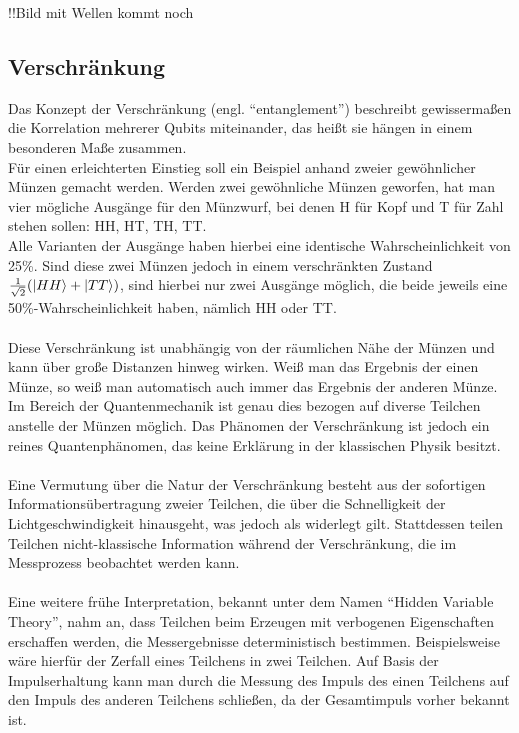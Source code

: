!!Bild mit Wellen kommt noch

\subsection{Verschränkung }

Das Konzept der Verschränkung (engl. ``entanglement'') beschreibt gewissermaßen die Korrelation mehrerer Qubits miteinander, das heißt sie hängen in einem besonderen Maße zusammen. \\
Für einen erleichterten Einstieg soll ein Beispiel anhand zweier gewöhnlicher Münzen gemacht werden. Werden zwei gewöhnliche Münzen geworfen, hat man vier mögliche Ausgänge für den Münzwurf, bei denen H für Kopf und T für Zahl stehen sollen: HH, HT, TH, TT. \\
Alle Varianten der Ausgänge haben hierbei eine identische Wahrscheinlichkeit von 25\%. Sind diese zwei Münzen jedoch in einem verschränkten Zustand  $\frac{1}{\sqrt{2}} (\ket{HH} + \ket{TT})$, sind hierbei nur zwei Ausgänge möglich, die beide jeweils eine 50\%-Wahrscheinlichkeit haben, nämlich HH oder TT. \\ \\
Diese Verschränkung ist unabhängig von der räumlichen Nähe der Münzen und kann über große Distanzen hinweg wirken. Weiß man das Ergebnis der einen Münze, so weiß man automatisch auch immer das Ergebnis der anderen Münze. Im Bereich der Quantenmechanik ist genau dies bezogen auf diverse Teilchen anstelle der Münzen möglich. 
Das Phänomen der Verschränkung ist jedoch ein reines Quantenphänomen, das keine Erklärung in der klassischen Physik besitzt. \\ \\
Eine Vermutung über die Natur der Verschränkung besteht aus der sofortigen Informationsübertragung zweier Teilchen, die über die Schnelligkeit der Lichtgeschwindigkeit hinausgeht, was jedoch als widerlegt gilt. Stattdessen teilen Teilchen nicht-klassische Information während der Verschränkung, die im Messprozess beobachtet werden kann. \\ \\
Eine weitere frühe Interpretation, bekannt unter dem Namen ``Hidden Variable Theory'', nahm an, dass Teilchen beim Erzeugen mit verbogenen Eigenschaften erschaffen werden, die Messergebnisse deterministisch bestimmen. Beispielsweise wäre hierfür der Zerfall eines Teilchens in zwei Teilchen. Auf Basis der Impulserhaltung kann man durch die Messung des Impuls des einen Teilchens auf den Impuls des anderen Teilchens schließen, da der Gesamtimpuls vorher bekannt ist. 
\cite{hughes_quantum_2021}
\\ 

